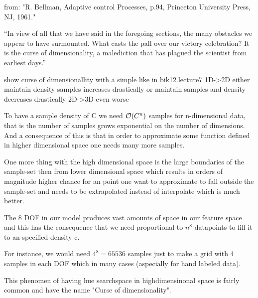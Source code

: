 from:
"R. Bellman, Adaptive control Processes, p.94, Princeton University Press, NJ,
1961."

“In view of all that we have said in the foregoing
sections, the many obstacles we appear to have
surmounted. What casts the pall over our victory
celebration? It is the curse of dimensionality, a
malediction that has plagued the scientist from
earliest days.”


show curse of dimensionallity with a simple like in bik12.lecture7
1D->2D
either maintain density samples increases drastically
or maintain samples and density decreases drastically
2D->3D
even worse

To have a sample density of C we need $\mathcal{O}{\left(C^n\right)}$ samples for n-dimensional data,
that is the number of samples grows exponential on the number of dimensions.
And a consequence of this is that in order to approximate some
function defined in higher dimensional space one needs many more samples.

One more thing with the high dimensional space is the large boundaries 
of the sample-set then from lower dimensional space which results in orders of
magnitude higher chance for an point one want to approximate to fall outside
the sample-set and needs to be extrapolated instead of interpolate which is
much better.

%
%

%
%

%
%




The 8 DOF in our model produces vast amounts of space in our feature space and this has the consequence that we need proportional to $n^8$ datapoints to fill it to an specified density c.

For instance, we would need $4^8=65536$ samples just to make a grid with 4 samples in each DOF which in many cases (aspecially for hand labeled data). 

This phenomen of having hue searchspace in highdimensinonal space is fairly common and have the name "Curse of dimensionality".

